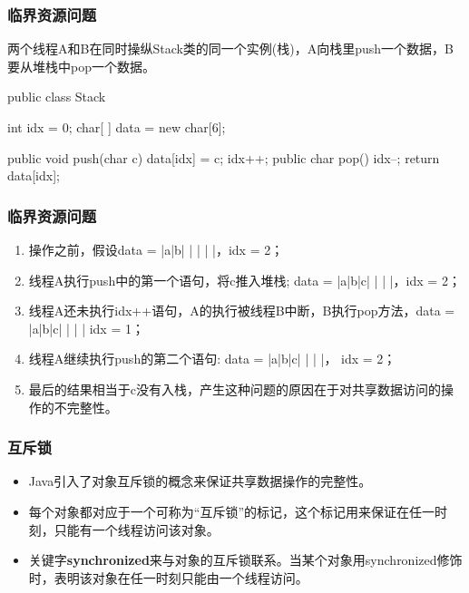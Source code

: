 \begin{frame}[fragile] %
\frametitle{临界资源问题}

两个线程A和B在同时操纵Stack类的同一个实例(栈)，A向栈里push一个数据，B要从堆栈中pop一个数据。


\begin{javaCode}
public class Stack {
  int idx = 0;
  char[ ] data = new char[6];
  
  public void push(char c) {
    data[idx] = c;
    idx++;
  }
  public char pop() {
    idx--;
    return data[idx];
  }
}
\end{javaCode}
\end{frame}

\begin{frame}[fragile] %
\frametitle{临界资源问题}

\begin{enumerate}
\item 操作之前，假设data = |a|b| | | | |，idx = 2；
\item 线程A执行push中的第一个语句，将c推入堆栈; data = |a|b|c| | | |，idx = 2；
\item 线程A还未执行idx++语句，A的执行被线程B中断，B执行pop方法，data = |a|b|c| | | | idx = 1；
\item 线程A继续执行push的第二个语句: data = |a|b|c| | | |， idx = 2；
\item 最后的结果相当于c没有入栈，产生这种问题的原因在于对共享数据访问的操作的不完整性。
\end{enumerate}
\end{frame}

\begin{frame}[fragile] %
  \frametitle{互斥锁}
  
  \begin{itemize}
  \item Java引入了{\hei 对象互斥锁}的概念来保证共享数据操作的完整性。
  \item 每个对象都对应于一个可称为“互斥锁”的标记，这个标记用来保证在任一时刻，只能有一个线程访问该对象。
  \item 关键字{\Red\bf synchronized}来与对象的互斥锁联系。当某个对象用synchronized修饰时，表明该对象在任一时刻只能由一个线程访问。
  \end{itemize}
\end{frame}


